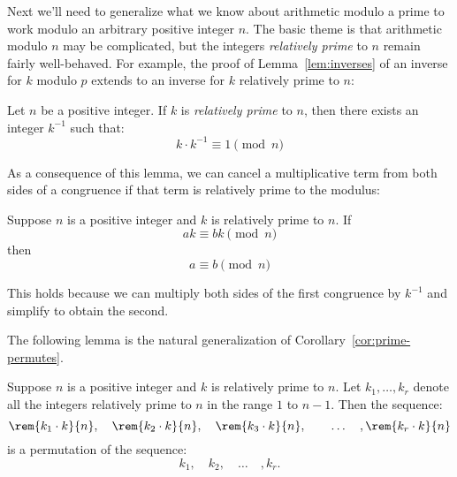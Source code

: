 Next we'll need to generalize what we know about arithmetic modulo a
prime to work modulo an arbitrary
positive integer $n$.  The basic theme is that arithmetic modulo $n$ may
be complicated, but the integers \emph{relatively prime} to $n$ remain
fairly well-behaved.  For example, the proof of Lemma~\ref{lem:inverses}
of an inverse for $k$ modulo $p$ extends to an inverse for $k$ relatively
prime to $n$:

\begin{lemma}
\label{lem:inverse-arb}
Let $n$ be a positive integer.  If $k$ is \emph{relatively prime} to
$n$, then there exists an integer $k^{-1}$ such that:
%
\[
k \cdot k^{-1} \equiv 1 \pmod{n}
\]
\end{lemma}


\iffalse
\begin{proof}
There exist integers $s$ and $t$ such that $s k + t n = \gcd(k, n) =
1$ by Theorem~\ref{th:gcd}.  Rearranging terms gives $tn = 1 - sk$,
which implies that $n \divides 1 - sk$ and $sk \equiv 1 \pmod{n}$.  Define
$k^{-1}$ to be $s$.
\end{proof}
\fi

As a consequence of this lemma, we can cancel a multiplicative term
from both sides of a congruence if that term is relatively prime to
the modulus:

\begin{corollary}
\label{cor:cancellation-arb}
Suppose $n$ is a positive integer and $k$ is relatively prime to $n$.
If
%
\[
a k \equiv b k \pmod{n}
\]
%
then
%
\[
a \equiv b \pmod{n}
\]
\end{corollary}

This holds because we can multiply both sides of the first congruence
by $k^{-1}$ and simplify to obtain the second.

The following lemma is the natural generalization of
Corollary~\ref{cor:prime-permutes}.
\begin{lemma}
\label{lem:permutes-arb}
Suppose $n$ is a positive integer and $k$ is relatively prime to $n$.
Let $k_1, \dots, k_r$ denote all the integers relatively prime to $n$
in the range $1$ to $n-1$.  Then the sequence:
%
\[
\rem{k_1 \cdot k}{n},\quad
\rem{k_2 \cdot k}{n},\quad
\rem{k_3 \cdot k}{n},\quad
\quad \dots\quad,
\rem{k_r \cdot k}{n}
\]
%
is a permutation of the sequence:
%
\[
k_1,\quad k_2,\quad \dots\quad, k_r.
\]
\end{lemma}

